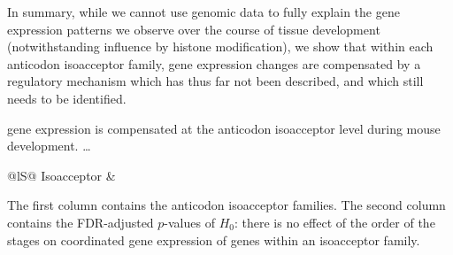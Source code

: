 \parrule

In summary, while we cannot use genomic data to fully explain the \trna gene
expression patterns we observe over the course of tissue development
(notwithstanding influence by histone modification), we show that within each
anticodon isoacceptor family, \trna gene expression changes are compensated by
a regulatory mechanism which has thus far not been described, and which still
needs to be identified.

    {\trna gene expression is compensated at the anticodon isoacceptor level
    during mouse development.}
    {…}

\begin{table}[h!]
    \centering
    \begin{tabular}{@{}lS@{}}
        \toprule
        Isoacceptor & \\
        \midrule
        
        \bottomrule
    \end{tabular}

    {The first column contains the \trna anticodon isoacceptor families. The
    second column contains the FDR-adjusted \(p\)-values of \(H_0\): there is no
    effect of the order of the stages on coordinated gene expression of \trna
    genes within an isoacceptor family.}
\end{table}
